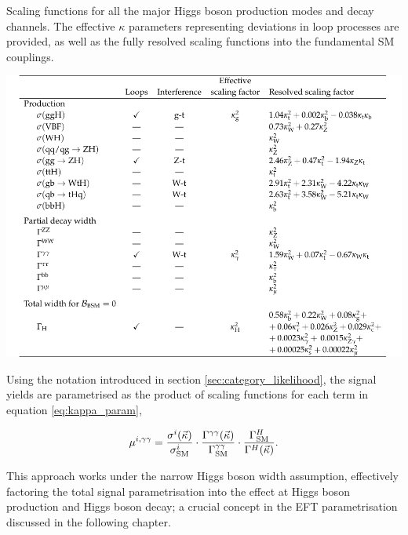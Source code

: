 \begin{table}[htb!]
  \centering
  \caption[The $\kappa$-framework parametrisation]
  {
    Scaling functions for all the major Higgs boson production modes and decay channels. The effective $\kappa$ parameters representing deviations in loop processes are provided, as well as the fully resolved scaling functions into the fundamental SM couplings.
  }
  \label{tab:kappa_param}
  \includegraphics[width=1\textwidth]{Tables/hgg_results/kappa_table.pdf}
\end{table}

Using the notation introduced in section \ref{sec:category_likelihood}, the signal yields are parametrised as the product of scaling functions for each term in equation \ref{eq:kappa_param},

\begin{equation}
    \mu^{i,\gamma\gamma} = \frac{\sigma^i(\vec{\kappa})}{\sigma^i_{\rm{SM}}} \cdot \frac{\Gamma^{\gamma\gamma}(\vec{\kappa})}{\Gamma^{\gamma\gamma}_{\rm{SM}}} \cdot \frac{\Gamma^H_{\rm{SM}}}{\Gamma^{H}(\vec{\kappa})}.
\end{equation}

\noindent
This approach works under the narrow Higgs boson width assumption, effectively factoring the total signal parametrisation into the effect at Higgs boson production and Higgs boson decay; a crucial concept in the EFT parametrisation discussed in the following chapter.

